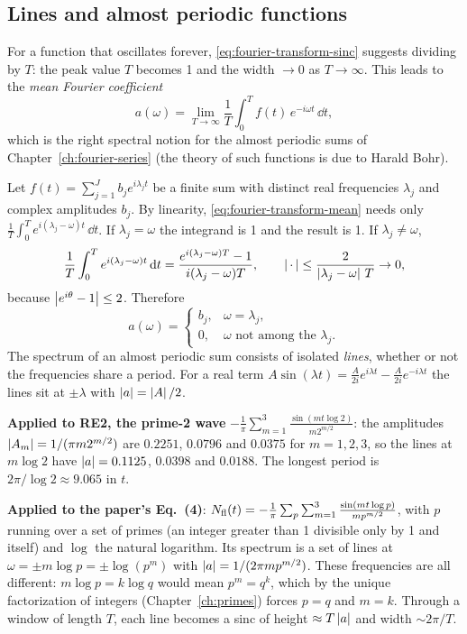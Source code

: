 \subsection{Lines and almost periodic functions}

For a function that oscillates forever, \eqref{eq:fourier-transform-sinc} suggests dividing by $T$: the peak value $T$ becomes 1 and the width $\to0$ as $T\to\infty$. This leads to the \emph{mean Fourier coefficient}
\begin{equation}
a(\omega)=\lim_{T\to\infty}\frac1T\int_0^Tf(t)\,e^{-i\omega t}\,\dd t ,
\label{eq:fourier-transform-mean}
\end{equation}
which is the right spectral notion for the almost periodic sums of Chapter~\ref{ch:fourier-series} (the theory of such functions is due to Harald Bohr).

Let $f(t)=\sum_{j=1}^{J}b_je^{i\lambda_jt}$ be a finite sum with distinct real frequencies $\lambda_j$ and complex amplitudes $b_j$. By linearity, \eqref{eq:fourier-transform-mean} needs only $\frac1T\int_0^Te^{i(\lambda_j-\omega)t}\,\dd t$. If $\lambda_j=\omega$ the integrand is 1 and the result is 1. If $\lambda_j\neq\omega$,
\[\frac1T\int_0^Te^{i(\lambda_j-\omega)t}\,\mathrm{d} t=\frac{e^{i(\lambda_j-\omega)T}-1}{i(\lambda_j-\omega)T},\qquad
\left|\,\cdot\,\right|\le\frac{2}{\left\lvert \lambda_j-\omega\right\rvert\,T}\to0,\]
because $\left\lvert e^{i\theta}-1\right\rvert\le2$. Therefore
\begin{equation}
a(\omega)=\begin{cases}b_j,&\omega=\lambda_j,\\0,&\omega\text{ not among the }\lambda_j.\end{cases}
\label{eq:fourier-transform-lines}
\end{equation}
The spectrum of an almost periodic sum consists of isolated \emph{lines}, whether or not the frequencies share a period. For a real term $A\sin(\lambda t)=\frac{A}{2i}e^{i\lambda t}-\frac{A}{2i}e^{-i\lambda t}$ the lines sit at $\pm\lambda$ with $\left\lvert a\right\rvert=\left\lvert A\right\rvert/2$.

\textbf{Applied to RE2, the prime-2 wave} $-\frac1\pi\sum_{m=1}^{3}\frac{\sin(mt\log2)}{m2^{m/2}}$: the amplitudes $\left\lvert A_m\right\rvert=1/(\pi m2^{m/2})$ are $0.2251$, $0.0796$ and $0.0375$ for $m=1,2,3$, so the lines at $m\log2$ have $\left\lvert a\right\rvert=0.1125$, $0.0398$ and $0.0188$. The longest period is $2\pi/\log 2\approx9.065$ in $t$.

\textbf{Applied to the paper's Eq.~(4)}: $N_{\rm fl}(t)=-\frac1\pi\sum_{p}\sum_{m=1}^{3}\frac{\sin(mt\log p)}{mp^{m/2}}$, with $p$ running over a set of primes (an integer greater than 1 divisible only by 1 and itself) and $\log$ the natural logarithm. Its spectrum is a set of lines at $\omega=\pm m\log p=\pm\log(p^m)$ with $\left\lvert a\right\rvert=1/(2\pi mp^{m/2})$. These frequencies are all different: $m\log p=k\log q$ would mean $p^m=q^k$, which by the unique factorization of integers (Chapter~\ref{ch:primes}) forces $p=q$ and $m=k$. Through a window of length $T$, each line becomes a sinc of height $\approx T\left\lvert a\right\rvert$ and width $\sim2\pi/T$.

